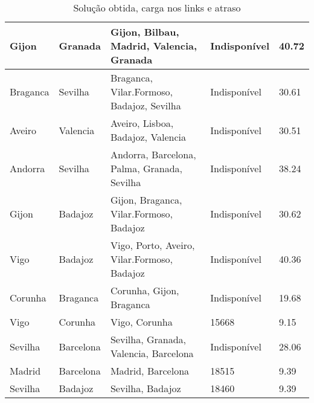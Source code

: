 \begin{table}[!htb]
{\begin{tabular}{|l|l|l|l|l|}
Gijon & Granada & Gijon, Bilbau, Madrid, Valencia, Granada & Indisponível & 40.72 \\ \hline
Braganca & Sevilha & Braganca, Vilar.Formoso, Badajoz, Sevilha & Indisponível & 30.61 \\ \hline
Aveiro & Valencia & Aveiro, Lisboa, Badajoz, Valencia & Indisponível & 30.51 \\ \hline
Andorra & Sevilha & Andorra, Barcelona, Palma, Granada, Sevilha & Indisponível & 38.24 \\ \hline
Gijon & Badajoz & Gijon, Braganca, Vilar.Formoso, Badajoz & Indisponível & 30.62 \\ \hline
Vigo & Badajoz & Vigo, Porto, Aveiro, Vilar.Formoso, Badajoz & Indisponível & 40.36 \\ \hline
Corunha & Braganca & Corunha, Gijon, Braganca & Indisponível & 19.68 \\ \hline
Vigo & Corunha & Vigo, Corunha & 15668 & 9.15 \\ \hline
Sevilha & Barcelona & Sevilha, Granada, Valencia, Barcelona & Indisponível & 28.06 \\ \hline
Madrid & Barcelona & Madrid, Barcelona & 18515 & 9.39 \\ \hline
Sevilha & Badajoz & Sevilha, Badajoz & 18460 & 9.39 \\ \hline
\end{tabular}}
\caption[]{Solução obtida, carga nos links e atraso}
\end{table}


